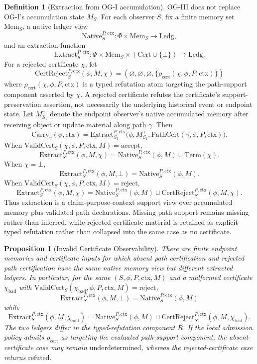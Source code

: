 \documentclass[11pt,twoside]{article}
\newtheorem{proposition}[theorem]{Proposition}
\theoremstyle{definition}
\newtheorem{definition}[theorem]{Definition}
\newcommand{\Carry}{\mathrm{Carry}}
\newcommand{\PathCert}{\mathrm{PathCert}}
\newcommand{\ValidCert}{\mathrm{ValidCert}}
\newcommand{\CertReject}{\mathrm{CertReject}}
\newcommand{\Term}{\mathrm{Term}}
\newcommand{\Extract}{\mathrm{Extract}}
\newcommand{\Ledg}{\mathrm{Ledg}}
\newcommand{\Mem}{\mathrm{Mem}}
\newcommand{\Native}{\mathrm{Native}}
\newcommand{\ctx}{\mathrm{ctx}}
\newcommand{\refuted}{\mathrm{refuted}}
\newcommand{\underdetermined}{\mathrm{underdetermined}}
\begin{document}
\begin{definition}[Extraction from OG-I accumulation]
\label{def:extraction}
OG-III does not replace OG-I's accumulation state $M_S$. For each observer
$S$, fix a finite memory set $\Mem_S$, a native ledger view
\[
  \Native_S^{P,\ctx}:\Phi\times\Mem_S\to\Ledg,
\]
and an extraction function
\[
  \Extract_S^{P,\ctx}:
  \Phi\times\Mem_S\times(\mathrm{Cert}\cup\{\bot\})\to\Ledg.
\]
For a rejected certificate $\chi$, let
\[
  \CertReject_S^{P,\ctx}(\phi,M,\chi)
  =
  (\varnothing,\varnothing,\varnothing,
    \{\rho_{\mathrm{cert}}(\chi,\phi,P,\ctx)\})
\]
where $\rho_{\mathrm{cert}}(\chi,\phi,P,\ctx)$ is a typed refutation atom
targeting the path-support component asserted by $\chi$. A rejected certificate
refutes the certificate's support-preservation assertion, not necessarily the
underlying historical event or endpoint state.
Let $M_{S_1}^{\gamma}$ denote the endpoint observer's native accumulated memory
after receiving object or update material along path $\gamma$. Then
\[
  \Carry_\gamma(\phi,\ctx)
  =
  \Extract_{S_1}^{P,\ctx}\bigl(\phi,M_{S_1}^{\gamma},\PathCert(\gamma,\phi,P,\ctx)\bigr).
\]
When $\ValidCert_S(\chi,\phi,P,\ctx,M)=\mathrm{accept}$,
\[
  \Extract_S^{P,\ctx}(\phi,M,\chi)
  =
  \Native_S^{P,\ctx}(\phi,M)\sqcup \Term(\chi).
\]
When $\chi=\bot$,
\[
  \Extract_S^{P,\ctx}(\phi,M,\bot)
  =
  \Native_S^{P,\ctx}(\phi,M).
\]
When
$\ValidCert_S(\chi,\phi,P,\ctx,M)=\mathrm{reject}$,
\[
  \Extract_S^{P,\ctx}(\phi,M,\chi)
  =
  \Native_S^{P,\ctx}(\phi,M)
  \sqcup
  \CertReject_S^{P,\ctx}(\phi,M,\chi).
\]
Thus extraction is a claim-purpose-context support view over accumulated memory
plus validated path declarations. Missing path support remains missing rather
than inferred, while rejected certificate material is retained as explicit
typed refutation rather than collapsed into the same case as no certificate.
\end{definition}

\begin{proposition}[Invalid Certificate Observability]
\label{prop:invalid-cert-observable}
There are finite endpoint memories and certificate inputs for which absent
path certification and rejected path certification have the same native memory
view but different extracted ledgers. In particular, for the same
$(S,\phi,P,\ctx,M)$ and a malformed certificate $\chi_{\mathrm{bad}}$ with
$\ValidCert_S(\chi_{\mathrm{bad}},\phi,P,\ctx,M)=\mathrm{reject}$,
\[
  \Extract_S^{P,\ctx}(\phi,M,\bot)
  =
  \Native_S^{P,\ctx}(\phi,M)
\]
while
\[
  \Extract_S^{P,\ctx}(\phi,M,\chi_{\mathrm{bad}})
  =
  \Native_S^{P,\ctx}(\phi,M)
  \sqcup
  \CertReject_S^{P,\ctx}(\phi,M,\chi_{\mathrm{bad}}).
\]
The two ledgers differ in the typed-refutation component $R$. If the local
admission policy admits $\rho_{\mathrm{cert}}$ as targeting the evaluated
path-support component, the absent-certificate case may remain
$\underdetermined$, whereas the rejected-certificate case returns
$\refuted$.
\end{proposition}
\end{document}
